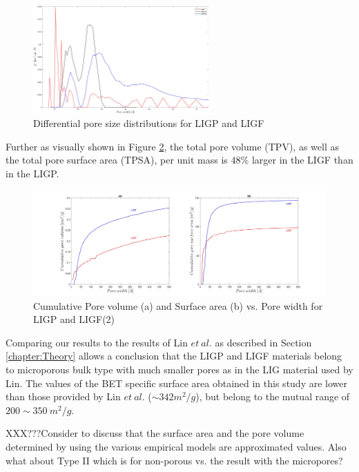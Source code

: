 \begin{figure}[H]
\centering
\includegraphics[width=0.6\textwidth]{Figures/Results/Diff_pore_volume_vs_width.jpg}
\medskip
\caption{Differential pore size distributions for LIGP and LIGF}
\label{fig:diff_volume_vs_pore_width}
\end{figure}

Further as visually shown in Figure \ref{fig:cumulative_vs_pore_width}, the total pore volume (TPV), as well as the total pore surface area (TPSA), per unit mass is 48$\%$ larger in the LIGF than in the LIGP. 


\begin{figure}[H]
\centering
\includegraphics[width=1\textwidth]{Figures/Results/Cumulative_Pore_vol_surf_width.jpg}
\medskip
\captionsetup{width=0.7\linewidth}
\caption{Cumulative Pore volume (a) and Surface area (b) vs. Pore width for LIGP and LIGF(2)}
\label{fig:cumulative_vs_pore_width}
\end{figure}


Comparing our results to the results of Lin $et\ al.$ \cite{lin_laser-induced_2014} as described in Section \ref{chapter:Theory} allows a conclusion that the LIGP and LIGF materials belong to microporous bulk type with much smaller pores as in the LIG material used by Lin. The values of the BET specific surface area obtained in this study are lower than those provided by Lin $et\:al.$ ($\sim 342m^2/g$), but belong to the mutual range of $200\sim350\:m^2/g$.

XXX???Consider to discuss that the surface area and the pore volume determined by using the various empirical models are approximated values. Also what about Type II which is for non-porous vs. the result with the micropores?

